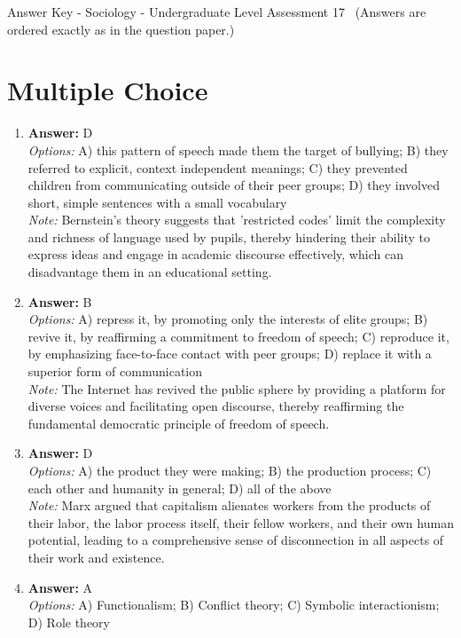 \documentclass[12pt]{article}
\begin{document}
\begin{center}
Answer Key - Sociology - Undergraduate Level Assessment 17 \
\small (Answers are ordered exactly as in the question paper.)
\end{center}

\section*{Multiple Choice}
\begin{enumerate}[label=\arabic*.]
\item \textbf{Answer:} D
\\ \textit{Options:} A) this pattern of speech made them the target of bullying; B) they referred to explicit, context independent meanings; C) they prevented children from communicating outside of their peer groups; D) they involved short, simple sentences with a small vocabulary
\\ \textit{Note:} Bernstein's theory suggests that 'restricted codes' limit the complexity and richness of language used by pupils, thereby hindering their ability to express ideas and engage in academic discourse effectively, which can disadvantage them in an educational setting.
\item \textbf{Answer:} B
\\ \textit{Options:} A) repress it, by promoting only the interests of elite groups; B) revive it, by reaffirming a commitment to freedom of speech; C) reproduce it, by emphasizing face-to-face contact with peer groups; D) replace it with a superior form of communication
\\ \textit{Note:} The Internet has revived the public sphere by providing a platform for diverse voices and facilitating open discourse, thereby reaffirming the fundamental democratic principle of freedom of speech.
\item \textbf{Answer:} D
\\ \textit{Options:} A) the product they were making; B) the production process; C) each other and humanity in general; D) all of the above
\\ \textit{Note:} Marx argued that capitalism alienates workers from the products of their labor, the labor process itself, their fellow workers, and their own human potential, leading to a comprehensive sense of disconnection in all aspects of their work and existence.
\item \textbf{Answer:} A
\\ \textit{Options:} A) Functionalism; B) Conflict theory; C) Symbolic interactionism; D) Role theory

\end{enumerate}
\end{document}
